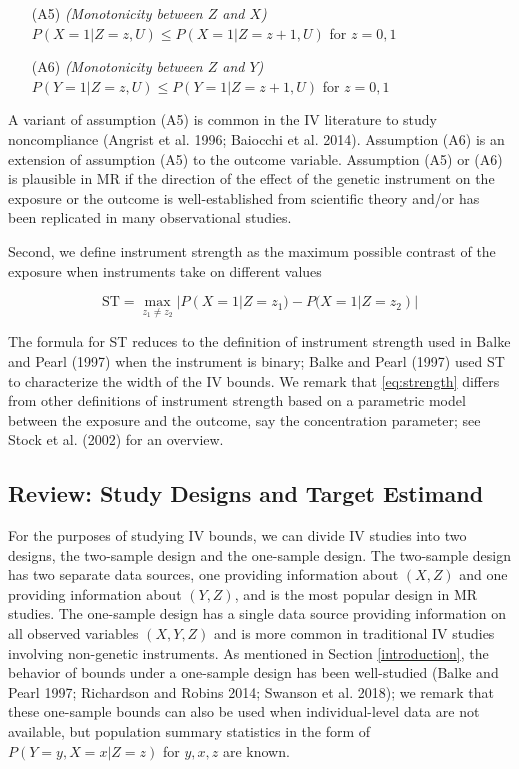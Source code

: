 \documentclass[
]{article}
\theoremstyle{plain}
\begin{document}
\begin{itemize}
\item[(A5)] \emph{(Monotonicity between $Z$ and $X$)} $P(X = 1 | Z = z, U) \le P(X = 1 | Z = z+1, U)$ for $z=0,1$
\item[(A6)] \emph{(Monotonicity between $Z$ and $Y$)} $P(Y = 1 | Z = z, U) \le P(Y = 1 | Z = z+1, U)$ for $z=0,1$
\end{itemize}

A variant of assumption (A5) is common in the IV literature to study noncompliance (Angrist et al. 1996; Baiocchi et al. 2014). Assumption (A6) is an extension of assumption (A5) to the outcome variable. Assumption (A5) or (A6) is plausible in MR if the direction of the effect of the genetic instrument on the exposure or the outcome is well-established from scientific theory and/or has been replicated in many observational studies.

Second, we define instrument strength as the maximum possible contrast of the exposure when instruments take on different values

\begin{equation}
\text{ST} = \max_{z_1 \neq z_2} | P(X = 1 | Z = z_1) - P(X = 1 | Z = z_2) | \label{eq:strength}
\end{equation}

The formula for ST reduces to the definition of instrument strength used in Balke and Pearl (1997) when the instrument is binary; Balke and Pearl (1997) used ST to characterize the width of the IV bounds. We remark that \eqref{eq:strength} differs from other definitions of instrument strength based on a parametric model between the exposure and the outcome, say the concentration parameter; see Stock et al. (2002) for an overview.

\hypertarget{review-study-designs-and-target-estimand}{%
\subsection{Review: Study Designs and Target Estimand}\label{review-study-designs-and-target-estimand}}

For the purposes of studying IV bounds, we can divide IV studies into two designs, the two-sample design and the one-sample design. The two-sample design has two separate data sources, one providing information about \((X,Z)\) and one providing information about \((Y,Z)\), and is the most popular design in MR studies. The one-sample design has a single data source providing information on all observed variables \((X,Y,Z)\) and is more common in traditional IV studies involving non-genetic instruments. As mentioned in Section \ref{introduction}, the behavior of bounds under a one-sample design has been well-studied (Balke and Pearl 1997; Richardson and Robins 2014; Swanson et al. 2018); we remark that these one-sample bounds can also be used when individual-level data are not available, but population summary statistics in the form of \(P(Y = y, X = x | Z = z)\) for \(y,x,z\) are known.
\end{document}
